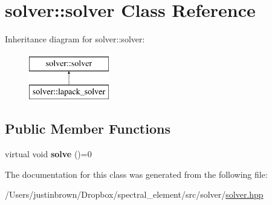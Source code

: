 \hypertarget{classsolver_1_1solver}{\section{solver\-:\-:solver Class Reference}
\label{classsolver_1_1solver}
}
Inheritance diagram for solver\-:\-:solver\-:\begin{figure}[H]
\begin{center}
\leavevmode
\includegraphics[height=2.000000cm]{classsolver_1_1solver}
\end{center}
\end{figure}
\subsection*{Public Member Functions}
\begin{DoxyCompactItemize}
\item 
\hypertarget{classsolver_1_1solver_a203d78069275d8e4ff12b7fece7a8f11}{virtual void {\bfseries solve} ()=0}\label{classsolver_1_1solver_a203d78069275d8e4ff12b7fece7a8f11}

\end{DoxyCompactItemize}


The documentation for this class was generated from the following file\-:\begin{DoxyCompactItemize}
\item 
/\-Users/justinbrown/\-Dropbox/spectral\-\_\-element/src/solver/\hyperlink{solver_8hpp}{solver.\-hpp}\end{DoxyCompactItemize}

